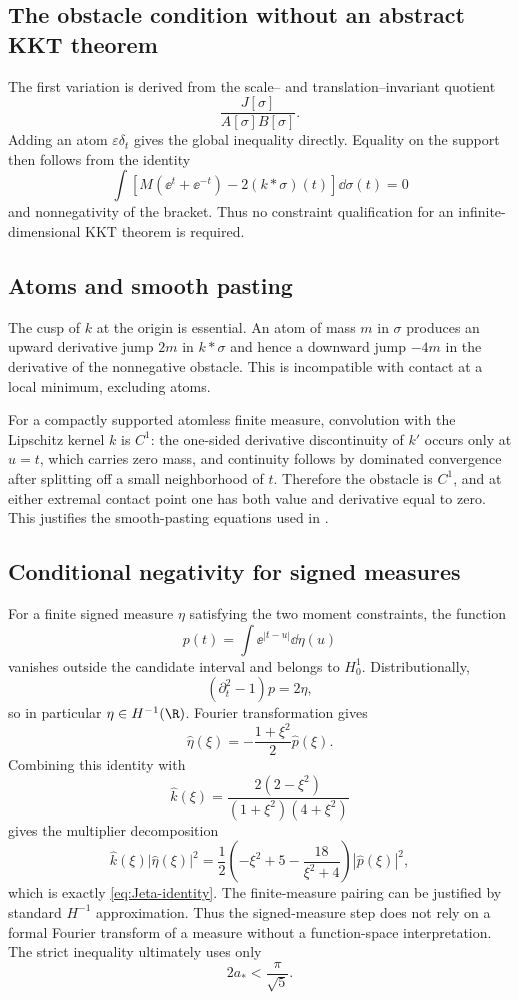 \subsection{The obstacle condition without an abstract KKT theorem}

The first variation is derived from the scale-- and translation--invariant quotient
\[
 \frac{J[\sigma]}{A[\sigma]B[\sigma]}.
\]
Adding an atom $\varepsilon\delta_t$ gives the global inequality directly.  Equality on the support then follows from the identity
\[
 \int\left[M(\ee^t+\ee^{-t})-2(k*\sigma)(t)\right]\dd\sigma(t)=0
\]
and nonnegativity of the bracket.  Thus no constraint qualification for an infinite-dimensional KKT theorem is required.

\subsection{Atoms and smooth pasting}

The cusp of $k$ at the origin is essential.  An atom of mass $m$ in $\sigma$ produces an upward derivative jump $2m$ in $k*\sigma$ and hence a downward jump $-4m$ in the derivative of the nonnegative obstacle.  This is incompatible with contact at a local minimum, excluding atoms.

For a compactly supported atomless finite measure, convolution with the Lipschitz kernel $k$ is $C^1$: the one-sided derivative discontinuity of $k'$ occurs only at $u=t$, which carries zero mass, and continuity follows by dominated convergence after splitting off a small neighborhood of $t$.  Therefore the obstacle is $C^1$, and at either extremal contact point one has both value and derivative equal to zero.  This justifies the smooth-pasting equations used in .

\subsection{Conditional negativity for signed measures}

For a finite signed measure $\eta$ satisfying the two moment constraints, the function
\[
 p(t)=\int\ee^{|t-u|}\dd\eta(u)
\]
vanishes outside the candidate interval and belongs to $H_0^1$.  Distributionally,
\[
 (\partial_t^2-1)p=2\eta,
\]
so in particular $\eta\in H^{-1}(\R)$.  Fourier transformation gives
\[
 \widehat\eta(\xi)=-\frac{1+\xi^2}{2}\widehat p(\xi).
\]
Combining this identity with
\[
 \widehat{k}(\xi)=\frac{2(2-\xi^2)}{(1+\xi^2)(4+\xi^2)}
\]
gives the multiplier decomposition
\[
 \widehat{k}(\xi)|\widehat\eta(\xi)|^2
 =\frac12\left(-\xi^2+5-\frac{18}{\xi^2+4}\right)|\widehat p(\xi)|^2,
\]
which is exactly \eqref{eq:Jeta-identity}.  The finite-measure pairing can be justified by standard $H^{-1}$ approximation.  Thus the signed-measure step does not rely on a formal Fourier transform of a measure without a function-space interpretation.  The strict inequality ultimately uses only
\[
 2a_*<\frac{\pi}{\sqrt5}.
\]

